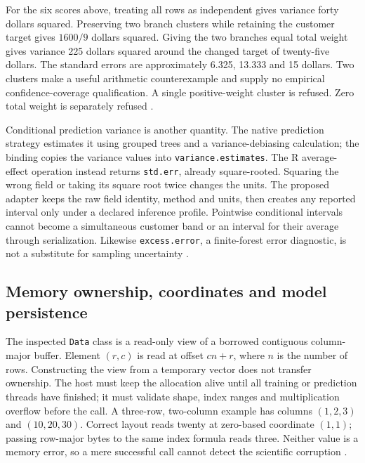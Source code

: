 For the six scores above, treating all rows as independent gives
variance forty dollars squared. Preserving two branch clusters while
retaining the customer target gives \(1600/9\) dollars squared. Giving
the two branches equal total weight gives variance 225 dollars squared
around the changed target of twenty-five dollars. The standard errors
are approximately 6.325, 13.333 and 15 dollars. Two clusters make a
useful arithmetic counterexample and supply no empirical
confidence-coverage qualification. A single positive-weight cluster is
refused. Zero total weight is separately refused
\cite{exec13_grf_oracle,exec13_grf_rpath}.

Conditional prediction variance is another quantity. The native
prediction strategy estimates it using grouped trees and a
variance-debiasing calculation; the binding copies the variance values
into \texttt{variance.estimates}. The R average-effect operation instead
returns \texttt{std.err}, already square-rooted. Squaring the wrong
field or taking its square root twice changes the units. The proposed
adapter keeps the raw field identity, method and units, then creates any
reported interval only under a declared inference profile. Pointwise
conditional intervals cannot become a simultaneous customer band or an
interval for their average through serialization. Likewise
\texttt{excess.error}, a finite-forest error diagnostic, is not a
substitute for sampling uncertainty
\cite{exec13_grf_native,exec13_grf_rpath}.

\subsection{Memory ownership, coordinates and model persistence}

The inspected \texttt{Data} class is a read-only view of a borrowed
contiguous column-major buffer. Element \((r,c)\) is read at offset
\(cn+r\), where \(n\) is the number of rows. Constructing the view from
a temporary vector does not transfer ownership. The host must keep the
allocation alive until all training or prediction threads have finished;
it must validate shape, index ranges and multiplication overflow before
the call. A three-row, two-column example has columns \((1,2,3)\) and
\((10,20,30)\). Correct layout reads twenty at zero-based coordinate
\((1,1)\); passing row-major bytes to the same index formula reads
three. Neither value is a memory error, so a mere successful call cannot
detect the scientific corruption
\cite{exec13_grf_memory,exec13_grf_oracle}.


